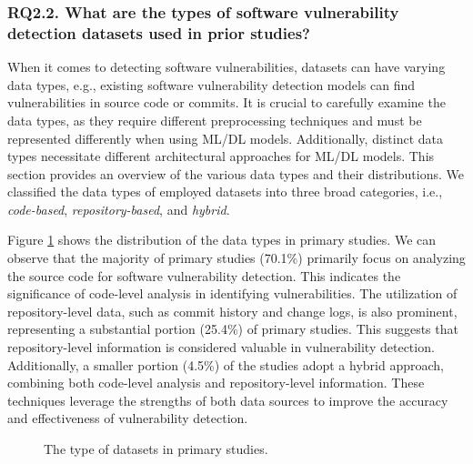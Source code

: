 \subsubsection{RQ2.2. What are the types of software vulnerability detection datasets used in prior studies?}

When it comes to detecting software vulnerabilities, datasets can have varying data types, e.g., existing software vulnerability detection models can find vulnerabilities in source code or commits. It is crucial to carefully examine the data types, as they require different preprocessing techniques and must be represented differently when using ML/DL models. Additionally, distinct data types necessitate different architectural approaches for ML/DL models. This section provides an overview of the various data types and their distributions. We classified the data types of employed datasets into three broad categories, i.e., \textit{code-based}, \textit{repository-based}, and \textit{hybrid}.

Figure \ref{fig:datasetsDist} shows the distribution of the data types in primary studies. We can observe that the majority of primary studies (70.1\%) primarily focus on analyzing the source code for software vulnerability detection. This indicates the significance of code-level analysis in identifying vulnerabilities. The utilization of repository-level data, such as commit history and change logs, is also prominent, representing a substantial portion (25.4\%) of primary studies. This suggests that repository-level information is considered valuable in vulnerability detection. Additionally, a smaller portion (4.5\%) of the studies adopt a hybrid approach, combining both code-level analysis and repository-level information. These techniques leverage the strengths of both data sources to improve the accuracy and effectiveness of vulnerability detection.

\begin{figure}[t!]
  \centering
{}
  \caption{The type of datasets in primary studies.}
  \label{fig:datasetsDist}
\end{figure}%



